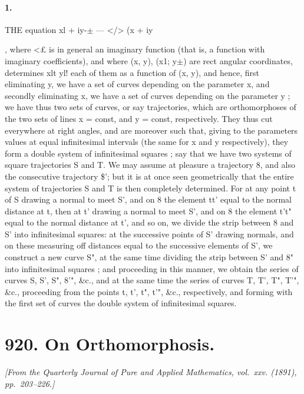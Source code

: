 \documentclass[11pt,a4paper]{book}
\begin{document}
{{{{{{{{{\paragraph{1.} THE  equation  xl  +  iy-$\pm$  ---  </>  (x  +  iy},  where  <£  is  in  general  an  imaginary  function
(that  is,  a  function  with  imaginary  coefficients),  and  where  (x, y),  (x1;  y$\pm$)  are  rect
angular  coordinates,  determines  xlt  yl!  each  of  them  as  a  function  of  (x, y),  and
hence,  first  eliminating  y,  we  have  a  set  of  curves  depending  on  the  parameter  x,
and  secondly  eliminating  x,  we  have  a  set  of  curves  depending  on  the  parameter  y ;
we  have  thus  two  sets  of  curves,  or  say  trajectories,  which  are  orthomorphoses  of
the  two  sets  of  lines  x  =  const,  and  y  =  const,  respectively.  They  thus  cut  everywhere
at  right  angles,  and  are  moreover  such  that,  giving  to  the  parameters  values  at  equal
infinitesimal  intervals  (the  same  for  x  and  y  respectively),  they  form  a  double  system
of  infinitesimal  squares ;  say  that  we  have  two  systems  of  square  trajectories  S  and  T.
We  may  assume  at  pleasure  a  trajectory  8,  and  also  the  consecutive  trajectory  \$';
but  it  is  at  once  seen  geometrically  that  the  entire  system  of  trajectories  S  and  T
is  then  completely  determined.  For  at  any  point  t  of  S  drawing  a  normal  to  meet  S',
and  on  8  the  element  tt'  equal  to  the  normal  distance  at  t,  then  at  t'  drawing  a
normal  to  meet  S',  and  on  8  the  element  t't"  equal  to  the  normal  distance  at  t',
and  so  on,  we  divide  the  strip  between  8  and  S'  into  infinitesimal  squares:  at  the
successive  points  of  S'  drawing  normals,  and  on  these  measuring  off  distances  equal
to  the  successive  elements  of  S',  we  construct  a  new  curve  S",  at  the  same  time
dividing  the  strip  between  S'  and  8"  into  infinitesimal  squares ;  and  proceeding  in
this  manner,  we  obtain  the  series  of  curves  S,  S',  S",  8'",  \&c.,  and  at  the  same  time
the  series  of  curves  T,  T',  T",  T'",  \&c.,  proceeding  from  the  points  t,  t',  t",  t'",  \&c.,
respectively,  and  forming  with  the  first  set  of  curves  the  double  system  of  infinitesimal
squares.



\newpage
\section*{920. On Orthomorphosis.}
\textit{[From the Quarterly Journal of Pure and Applied Mathematics, vol.~xxv. (1891), pp.~203--226.]}

}}}}}}}}
\end{document}
